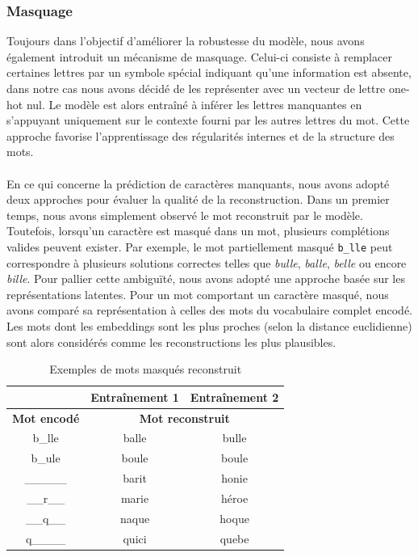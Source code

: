 \documentclass{article}
\begin{document}
\subsubsection{Masquage}

Toujours dans l’objectif d’améliorer la robustesse du modèle, nous avons également introduit un mécanisme de masquage. Celui-ci consiste à remplacer certaines lettres par un symbole spécial indiquant qu’une information est absente, dans notre cas nous avons décidé de les représenter avec un vecteur de lettre one-hot nul. Le modèle est alors entraîné à inférer les lettres manquantes en s’appuyant uniquement sur le contexte fourni par les autres lettres du mot. Cette approche favorise l’apprentissage des régularités internes et de la structure des mots.
\\ \\
En ce qui concerne la prédiction de caractères manquants, nous avons adopté deux approches pour évaluer la qualité de la reconstruction. Dans un premier temps, nous avons simplement observé le mot reconstruit par le modèle. Toutefois, lorsqu’un caractère est masqué dans un mot, plusieurs complétions valides peuvent exister. Par exemple, le mot partiellement masqué \texttt{b\_lle} peut correspondre à plusieurs solutions correctes telles que \textit{bulle}, \textit{balle}, \textit{belle} ou encore \textit{bille}. Pour pallier cette ambiguïté, nous avons adopté une approche basée sur les représentations latentes. Pour un mot comportant un caractère masqué, nous avons comparé sa représentation à celles des mots du vocabulaire complet encodé. Les mots dont les embeddings sont les plus proches (selon la distance euclidienne) sont alors considérés comme les reconstructions les plus plausibles.

\begin{table}[H]
\centering
\begin{tabular}{c|cc}
\hline
& \textbf{Entraînement 1} & \textbf{Entraînement 2}\\
\hline
\textbf{Mot encodé} & \multicolumn{2}{c}{\textbf{Mot reconstruit}}  \\
\hline
b\_lle & balle & bulle \\
b\_ule & boule & boule \\
\_\_\_\_\_ & barit & honie \\
\_\_r\_\_ & marie & héroe \\
\_\_q\_\_ & naque & hoque \\
q\_\_\_\_ & quici & quebe \\
\hline
\end{tabular}
\caption{Exemples de mots masqués reconstruit}
\end{table}
\end{document}
